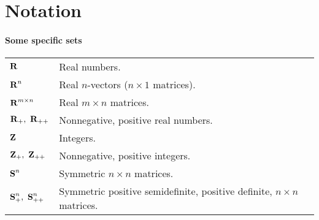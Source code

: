 \chapter{Notation}

\subsubsection*{Some specific sets}
\begin{longtable}{p{}p{}}
    ${\bf R{}}$ & Real numbers.\\
    ${\bf R{}}^n$ & Real $n$-vectors ($n \times 1$ matrices).\\
    ${\bf R{}}^{m \times n}$ & Real $m \times n$ matrices.\\
    $\reals_+,\ \reals_{++}$ & Nonnegative, positive real numbers.\\
    ${\bf Z{}}$ & Integers.\\
    $\ints_+,\ \ints_{++}$ & Nonnegative, positive integers.\\
    ${\bf S{}}^n$ & Symmetric $n \times n$ matrices.\\
    $\symms^n_+,\ \symms^n_{++}$ & Symmetric positive semidefinite, positive definite, $n \times n$ matrices.\\
\end{longtable}

